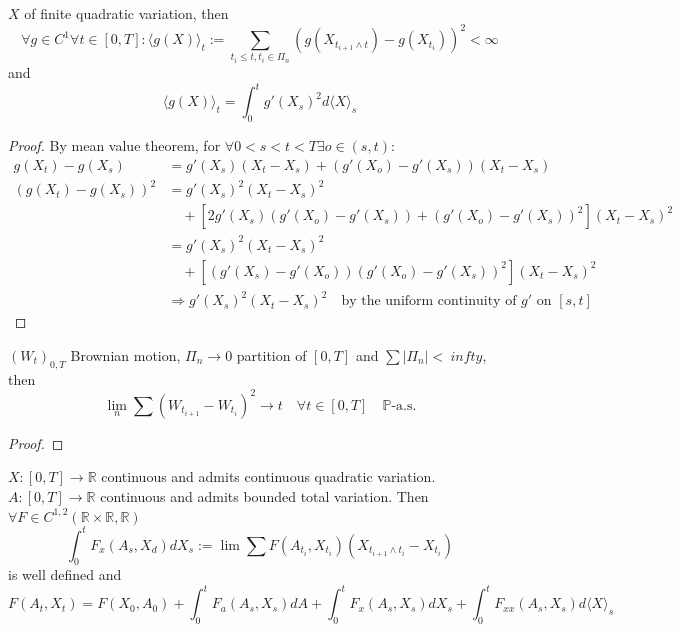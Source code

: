 \begin{lemma}[Excersice]
	$X$ of finite quadratic variation, then
	\begin{equation*}
		\forall g \in C^1 \forall t \in [0, T]: \langle g(X) \rangle_t := \sum_{t_i \leq t, t_i \in \Pi_n} (g(X_{t_{i+1}\wedge t}) - g(X_{t_i}))^2 < \infty
	\end{equation*} 
	and 
	\begin{equation*}
		\langle g(X) \rangle_t = \int_0^t g'(X_s)^2d\langle X \rangle_s
	\end{equation*}
\end{lemma}
\begin{proof}
By mean value theorem, for $\forall 0< s < t < T \exists o \in (s, t):$
	\begin{align*}
		g(X_t) - g(X_s) &= g'(X_s)(X_t - X_s) + (g'(X_o) - g'(X_s))(X_t - X_s)\\
		(g(X_t) - g(X_s))^2
		&= g'(X_s)^2(X_t - X_s)^2\\
		&\quad + [2g'(X_s) (g'(X_o) - g'(X_s)) + (g'(X_o) - g'(X_s))^2](X_t - X_s)^2\\
		&= g'(X_s)^2(X_t - X_s)^2\\
		&\quad + [(g'(X_s) - g'(X_o))(g'(X_o) - g'(X_s))^2](X_t - X_s)^2\\
		&\Rightarrow g'(X_s)^2(X_t - X_s)^2
		\quad \text{by the uniform continuity of } g' \text{ on } [s, t]
	\end{align*}
\end{proof}

\begin{theorem}
	$(W_t)_{0, T}$ Brownian motion, $\Pi_n \rightarrow 0$ partition of $[0, T]$ and $\sum |\Pi_n| < \ infty$, then
	\begin{equation*}
		\lim_n \sum (W_{t_{i+1}} - W_{t_i})^2 \rightarrow t \quad \forall t \in [0, T] \quad \mathbb{P}\text{-a.s.} 
	\end{equation*}
\end{theorem}
\begin{proof}
	
\end{proof}

\begin{theorem}
$X: [0, T] \rightarrow \mathbb{R}$ continuous and admits continuous quadratic variation. $A:[0, T] \rightarrow \mathbb{R}$ continuous and admits bounded total variation. Then $\forall F\in C^{1, 2}(\mathbb{R}\times \mathbb{R}, \mathbb{R})$
\begin{equation*}
	\int_0^t F_x(A_s, X_d) dX_s := \lim \sum F(A_{t_i}, X_{t_i})(X_{t_{i+1} \wedge t_i} - X_{t_i})
\end{equation*}
is well defined and
\begin{equation*}
	F(A_t, X_t) = F(X_0, A_0) + \int_0^t F_a(A_s, X_s) dA + \int_0^t F_x (A_s, X_s) dX_s + \int_0^t F_{xx} (A_s, X_s) d\langle X \rangle_s
\end{equation*}
\end{theorem}

